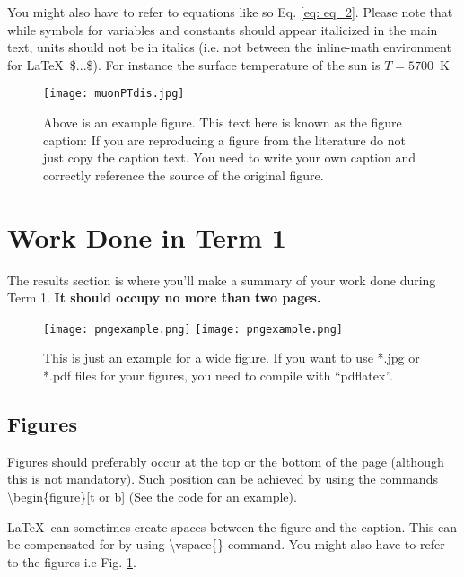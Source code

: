 \documentclass[a4paper,12pt, notitlepage]{article}
\begin{document}
You might also have to refer to equations like so Eq. \eqref{eq: eq_2}. Please note that while symbols for variables and constants should appear italicized in the main text, units should not be in italics (i.e. not between the inline-math environment for \LaTeX\ \$...\$). For instance the surface temperature of the sun is $T = 5700$~K

\begin{figure}[t!]
\centering
\texttt{[image: muonPTdis.jpg]}
\vspace{-2mm}
\caption{Above is an example figure.  This text here is known as the figure caption: If you are reproducing a figure from the literature do not just copy the caption text. You need to write your own caption and correctly reference the source of the original figure.}
\label{fig: fig_1}
\end{figure}

\section{Work Done in Term 1}
The results section is where you'll make a summary of your work done during Term 1. \textbf{It should occupy no more than two pages.}


\begin{figure*}[h!]
\centering
\texttt{[image: pngexample.png]} \hspace{3mm}
\texttt{[image: pngexample.png]}
\vspace{-2mm}
\caption{\small This is just an example for a wide figure. If you want to use *.jpg or *.pdf files for your figures, you need to compile with ``pdflatex''.}
\label{fig: fig_2}
\end{figure*}

\subsection{Figures}
Figures should preferably occur at the top or the bottom of the page (although this is not mandatory). Such position can be achieved by using the commands \textbackslash begin\{figure\}[t or b] (See the code for an example).  

\LaTeX\ can sometimes create spaces between the figure and the caption. This can be compensated for by using \textbackslash vspace\{\} command. You might also have to refer to the figures i.e Fig. \ref{fig: fig_1}.
\end{document}
